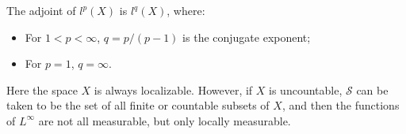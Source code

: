 The adjoint of $l^p(X)$ is $l^q(X)$, where:
\begin{itemize}
\item For $1 < p < \infty$, $q = p/(p-1)$ is the conjugate exponent;
\item For $p = 1$, $q = \infty$.
\end{itemize}
Here the space $X$ is always localizable. However, if $X$ is uncountable, $\mathcal{S}$ can be taken to be the set of all finite or countable subsets of $X$, and then the functions of $L^\infty$ are not all measurable, but only locally measurable.
